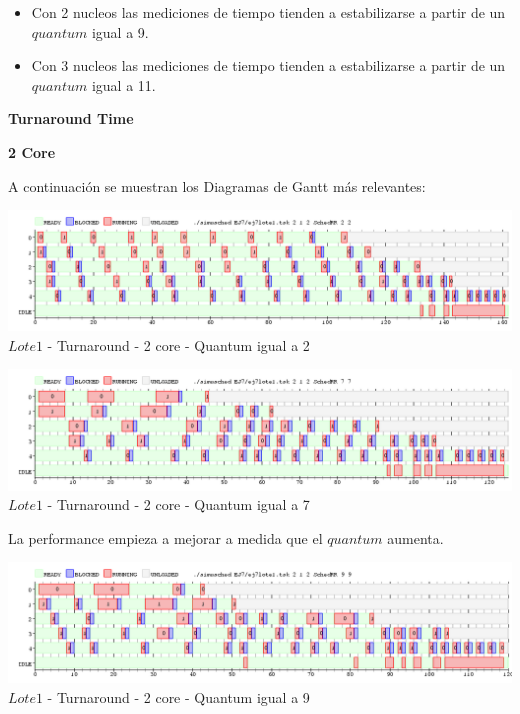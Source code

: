  \begin{itemize}
  \item Con 2 nucleos las mediciones de tiempo tienden a estabilizarse a partir de un $quantum$ igual a 9.
  \item Con 3 nucleos las mediciones de tiempo tienden a estabilizarse a partir de un $quantum$ igual a 11.
 \end{itemize}
 \begin{center}
 \textbf{Turnaround Time} 
  \end{center}

 \begin{center}
 \textbf{2 Core}
 \end{center}
  A continuación se muestran los Diagramas de Gantt más relevantes:
  
  \begin{center}
    	\includegraphics[width=450pt]{./EJ7/ej7tour2core1quan.png}
	{$Lote 1$ - Turnaround - 2 core - Quantum igual a 2}	
 \end{center}

   \begin{center}
    	\includegraphics[width=450pt]{./EJ7/ej7tour2core3quan.png}
	{$Lote 1$ - Turnaround - 2 core - Quantum igual a 7}	
 \end{center}
 
 
 \indent La performance empieza a mejorar a medida que el $quantum$ aumenta.
 
   \begin{center}
    	\includegraphics[width=450pt]{./EJ7/ej7tour2core4quan.png}
	{$Lote 1$ - Turnaround - 2 core - Quantum igual a 9}	
 \end{center}

